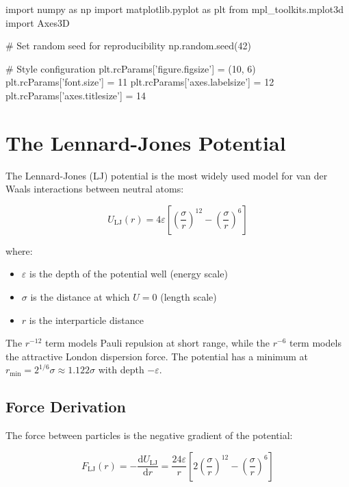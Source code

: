 \documentclass[11pt,a4paper]{article}
\newcommand{\dd}{\mathrm{d}}
\begin{document}
\begin{pycode}
import numpy as np
import matplotlib.pyplot as plt
from mpl_toolkits.mplot3d import Axes3D

# Set random seed for reproducibility
np.random.seed(42)

# Style configuration
plt.rcParams['figure.figsize'] = (10, 6)
plt.rcParams['font.size'] = 11
plt.rcParams['axes.labelsize'] = 12
plt.rcParams['axes.titlesize'] = 14
\end{pycode}

\section{The Lennard-Jones Potential}

The Lennard-Jones (LJ) potential is the most widely used model for van der Waals interactions between neutral atoms:

\begin{equation}
U_{\text{LJ}}(r) = 4\varepsilon \left[\left(\frac{\sigma}{r}\right)^{12} - \left(\frac{\sigma}{r}\right)^{6}\right]
\label{eq:lennard-jones}
\end{equation}

where:
\begin{itemize}
    \item $\varepsilon$ is the depth of the potential well (energy scale)
    \item $\sigma$ is the distance at which $U = 0$ (length scale)
    \item $r$ is the interparticle distance
\end{itemize}

The $r^{-12}$ term models Pauli repulsion at short range, while the $r^{-6}$ term models the attractive London dispersion force. The potential has a minimum at $r_{\text{min}} = 2^{1/6}\sigma \approx 1.122\sigma$ with depth $-\varepsilon$.

\subsection{Force Derivation}

The force between particles is the negative gradient of the potential:

\begin{equation}
F_{\text{LJ}}(r) = -\frac{\dd U_{\text{LJ}}}{\dd r} = \frac{24\varepsilon}{r}\left[2\left(\frac{\sigma}{r}\right)^{12} - \left(\frac{\sigma}{r}\right)^{6}\right]
\label{eq:lj-force}
\end{equation}
\end{document}
